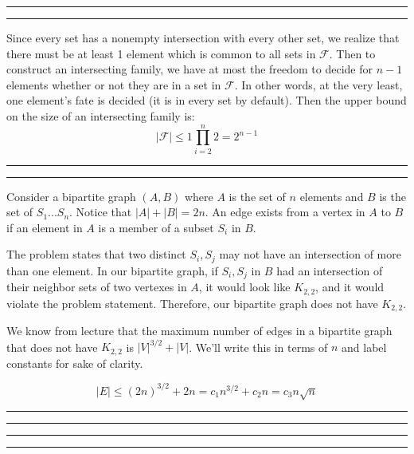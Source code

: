 \documentclass[11pt,letterpaper]{article}
\newcommand{\question}[1] {\vspace{.25in} \hrule\vspace{0.5em}
\noindent{\bf #1} \vspace{0.5em}
\hrule \vspace{.10in}}
\begin{document}
\question{4}
Since every set has a nonempty intersection with every other set, we realize that there must be at least 1 element which is common to all sets in $\mathcal{F}$.
Then to construct an intersecting family, we have at most the freedom to decide for $n-1$ elements whether or not they are in a set in $\mathcal{F}$. In other words, at the very least, one element's fate is decided (it is in every set by default).
Then the upper bound on the size of an intersecting family is:
$$ |\mathcal{F}| \leq 1 \prod_{i=2}^{n} 2 = 2^{n-1}$$

\question{5}

Consider a bipartite graph $(A,B)$ where $A$ is the set of $n$ elements and $B$ is the set of $S_1...S_n$. Notice that $|A| + |B| = 2n$.
An edge exists from a vertex in $A$ to $B$ if an element in $A$ is a member of a subset $S_i$ in $B$.

The problem states that two distinct $S_i, S_j$ may not have an intersection of more than one element.
In our bipartite graph, if $S_i, S_j$ in $B$ had an intersection of their neighbor sets of two vertexes in $A$, it would look like $K_{2,2}$,
and it would violate the problem statement. Therefore, our bipartite graph does not have $K_{2,2}$.

We know from lecture that the maximum number of edges in a bipartite graph that does not have $K_{2,2}$ is $|V|^{3/2} + |V|$. We'll write this in terms of $n$ and label constants for sake of clarity.

$$ |E| \leq (2n)^{3/2} + 2n = c_1 n^{3/2} + c_2n = c_{3}n\sqrt{n} $$



\question{6}

\question{7}
\end{document}
